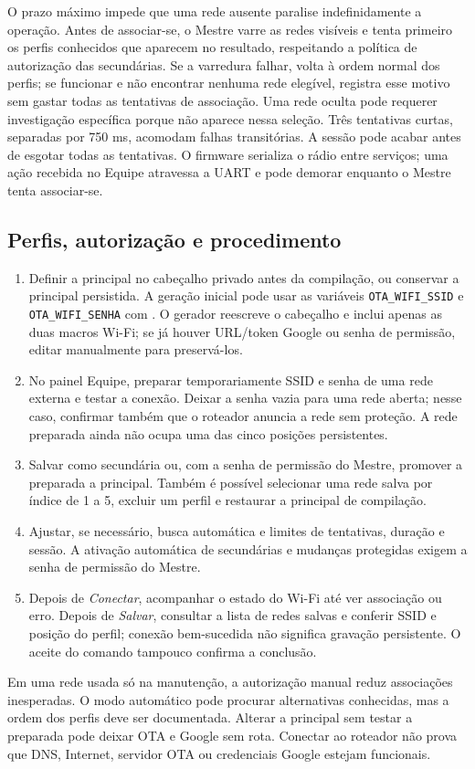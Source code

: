 O prazo máximo impede que uma rede ausente paralise indefinidamente a operação. Antes de associar-se, o Mestre varre as redes visíveis e tenta primeiro os perfis conhecidos que aparecem no resultado, respeitando a política de autorização das secundárias. Se a varredura falhar, volta à ordem normal dos perfis; se funcionar e não encontrar nenhuma rede elegível, registra esse motivo sem gastar todas as tentativas de associação. Uma rede oculta pode requerer investigação específica porque não aparece nessa seleção. Três tentativas curtas, separadas por 750 ms, acomodam falhas transitórias. A sessão pode acabar antes de esgotar todas as tentativas. O firmware serializa o rádio entre serviços; uma ação recebida no Equipe atravessa a UART e pode demorar enquanto o Mestre tenta associar-se.

\subsection{Perfis, autorização e procedimento}\label{sec:perfis-wifi}
\begin{enumerate}
  \item Definir a principal no cabeçalho privado antes da compilação, ou conservar a principal persistida. A geração inicial pode usar as variáveis \texttt{OTA\_WIFI\_SSID} e \texttt{OTA\_WIFI\_SENHA} com . O gerador reescreve o cabeçalho e inclui apenas as duas macros Wi-Fi; se já houver URL/token Google ou senha de permissão, editar manualmente para preservá-los.
  \item No painel Equipe, preparar temporariamente SSID e senha de uma rede externa e testar a conexão. Deixar a senha vazia para uma rede aberta; nesse caso, confirmar também que o roteador anuncia a rede sem proteção. A rede preparada ainda não ocupa uma das cinco posições persistentes.
  \item Salvar como secundária ou, com a senha de permissão do Mestre, promover a preparada a principal. Também é possível selecionar uma rede salva por índice de 1 a 5, excluir um perfil e restaurar a principal de compilação.
  \item Ajustar, se necessário, busca automática e limites de tentativas, duração e sessão. A ativação automática de secundárias e mudanças protegidas exigem a senha de permissão do Mestre.
  \item Depois de \emph{Conectar}, acompanhar o estado do Wi-Fi até ver associação ou erro. Depois de \emph{Salvar}, consultar a lista de redes salvas e conferir SSID e posição do perfil; conexão bem-sucedida não significa gravação persistente. O aceite do comando tampouco confirma a conclusão.
\end{enumerate}
Em uma rede usada só na manutenção, a autorização manual reduz associações inesperadas. O modo automático pode procurar alternativas conhecidas, mas a ordem dos perfis deve ser documentada. Alterar a principal sem testar a preparada pode deixar OTA e Google sem rota. Conectar ao roteador não prova que DNS, Internet, servidor OTA ou credenciais Google estejam funcionais.

